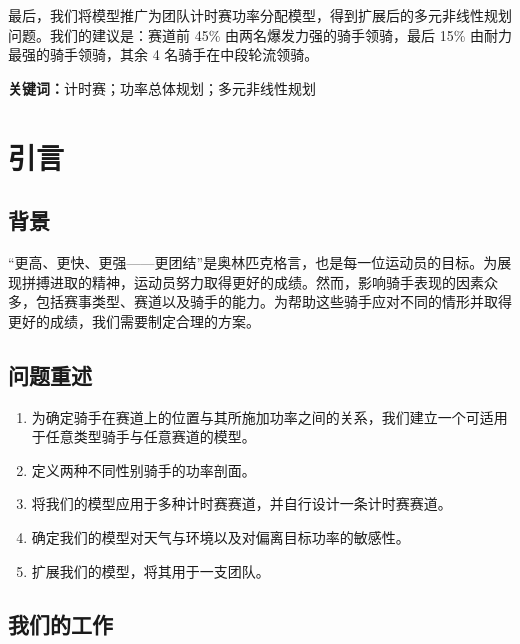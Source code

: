 \documentclass[11pt,a4paper]{ctexart}
\begin{document}
最后，我们将模型推广为团队计时赛功率分配模型，得到扩展后的多元非线性规划问题。我们的建议是：赛道前 45\% 由两名爆发力强的骑手领骑，最后 15\% 由耐力最强的骑手领骑，其余 4 名骑手在中段轮流领骑。

\vspace{6pt}
\noindent\textbf{关键词：}计时赛；功率总体规划；多元非线性规划

\newpage
\pagestyle{fancy}

\section{引言}

\subsection{背景}

“更高、更快、更强——更团结”是奥林匹克格言，也是每一位运动员的目标。为展现拼搏进取的精神，运动员努力取得更好的成绩。然而，影响骑手表现的因素众多，包括赛事类型、赛道以及骑手的能力。为帮助这些骑手应对不同的情形并取得更好的成绩，我们需要制定合理的方案。

\subsection{问题重述}

\begin{enumerate}
\item 为确定骑手在赛道上的位置与其所施加功率之间的关系，我们建立一个可适用于任意类型骑手与任意赛道的模型。
\item 定义两种不同性别骑手的功率剖面。
\item 将我们的模型应用于多种计时赛赛道，并自行设计一条计时赛赛道。
\item 确定我们的模型对天气与环境以及对偏离目标功率的敏感性。
\item 扩展我们的模型，将其用于一支团队。
\end{enumerate}

\subsection{我们的工作}
\end{document}
